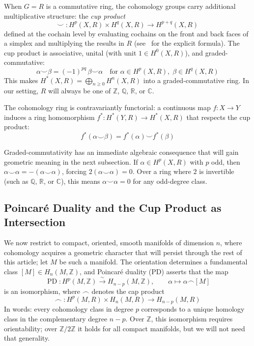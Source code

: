 \documentclass{article}
\newcommand{\C}{\mathbb{C}}
\newcommand{\Q}{\mathbb{Q}}
\newcommand{\R}{\mathbb{R}}
\newcommand{\Z}{{\mathbb{Z}}}
\begin{document}
When $G = R$ is a commutative ring, the cohomology groups carry additional
multiplicative structure: the \emph{cup product}
\[
  \smile\;: H^p(X, R) \times H^q(X, R) \longrightarrow H^{p+q}(X, R)
\]
defined at the cochain level by evaluating cochains on the front and back faces
of a simplex and multiplying the results in $R$
(see~\cite{NateAlgTop} for the explicit formula). The cup product is
associative, unital (with unit $1 \in H^0(X, R)$), and graded-commutative:
\[
  \alpha \smile \beta = (-1)^{pq}\, \beta \smile \alpha
  \quad\text{for } \alpha \in H^p(X,R),\; \beta \in H^q(X,R)
\]
This makes $H^*(X, R) = \bigoplus_{n \geq 0} H^n(X, R)$ into a
graded-commutative ring. In our setting, $R$ will always be one of $\Z$, $\Q$,
$\R$, or $\C$.

The cohomology ring is contravariantly functorial: a continuous map $f: X \to
Y$ induces a ring homomorphism $f^*: H^*(Y, R) \to H^*(X, R)$ that respects
the cup product:
\[
  f^*(\alpha \smile \beta) = f^*(\alpha) \smile f^*(\beta)
\]

Graded-commutativity has an immediate algebraic consequence that will gain
geometric meaning in the next subsection. If $\alpha \in H^p(X, R)$ with $p$
odd, then $\alpha \smile \alpha = -(\alpha \smile \alpha)$, forcing $2(\alpha
\smile \alpha) = 0$. Over a ring where $2$ is invertible (such as $\Q$, $\R$,
or $\C$), this means $\alpha \smile \alpha = 0$ for any odd-degree class.

\subsection{Poincar\'{e} Duality and the Cup Product as Intersection}%
\label{subsec:poincare}

We now restrict to compact, oriented, smooth manifolds of dimension $n$, where cohomology acquires a geometric
character that will persist through the rest of this article; let $M$ be such a manifold. The orientation
determines a fundamental class $[M] \in H_n(M, \Z)$, and Poincar\'{e} duality (PD) asserts that the map
\[
  \operatorname{PD}: H^p(M, \Z) \xrightarrow{\;\sim\;} H_{n-p}(M, \Z),
  \qquad \alpha \longmapsto \alpha \frown [M]
\]
is an isomorphism, where $\frown$ denotes the cap product
\[
  \frown\;: H^p(M, R) \times H_n(M, R) \longrightarrow H_{n-p}(M, R)
\]
In words: every cohomology class in degree $p$ corresponds to a unique homology
class in the complementary degree $n - p$. Over $\Z$, this isomorphism
requires orientability; over $\Z/2\Z$ it holds for all compact manifolds, but
we will not need that generality.
\end{document}
